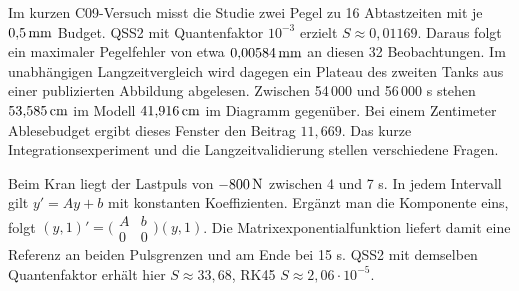 Im kurzen C09-Versuch misst die Studie zwei Pegel zu 16 Abtastzeiten mit je \(0{,}5\,\mathrm{mm}\) Budget. QSS2 mit Quantenfaktor \(10^{-3}\) erzielt \(S\approx0{,}01169\). Daraus folgt ein maximaler Pegelfehler von etwa \(0{,}00584\,\mathrm{mm}\) an diesen 32 Beobachtungen. Im unabhängigen Langzeitvergleich wird dagegen ein Plateau des zweiten Tanks aus einer publizierten Abbildung abgelesen. Zwischen 54\,000 und 56\,000 s stehen \(53{,}585\,\mathrm{cm}\) im Modell \(41{,}916\,\mathrm{cm}\) im Diagramm gegenüber. Bei einem Zentimeter Ablesebudget ergibt dieses Fenster den Beitrag \(11{,}669\). Das kurze Integrationsexperiment und die Langzeitvalidierung stellen verschiedene Fragen.

Beim Kran liegt der Lastpuls von \(-800\,\mathrm{N}\) zwischen 4 und 7 s. In jedem Intervall gilt \(y'=A y+b\) mit konstanten Koeffizienten. Ergänzt man die Komponente eins, folgt \((y,1)'=\bigl(\begin{smallmatrix}A&b\\0&0\end{smallmatrix}\bigr)(y,1)\). Die Matrixexponentialfunktion liefert damit eine Referenz an beiden Pulsgrenzen und am Ende bei 15 s. QSS2 mit demselben Quantenfaktor erhält hier \(S\approx33{,}68\), RK45 \(S\approx2{,}06\cdot10^{-5}\).
